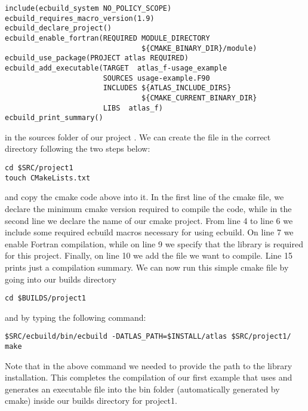 \begin{description}
\begin{lstlisting}[style=XMLStyle]
include(ecbuild_system NO_POLICY_SCOPE)
ecbuild_requires_macro_version(1.9)
ecbuild_declare_project()
ecbuild_enable_fortran(REQUIRED MODULE_DIRECTORY 
                                ${CMAKE_BINARY_DIR}/module)
ecbuild_use_package(PROJECT atlas REQUIRED)
ecbuild_add_executable(TARGET  atlas_f-usage_example
                       SOURCES usage-example.F90 
                       INCLUDES ${ATLAS_INCLUDE_DIRS}
                                ${CMAKE_CURRENT_BINARY_DIR}
                       LIBS  atlas_f)
ecbuild_print_summary()
\end{lstlisting}
%
in the sources folder of our project .
We can create the  file in the correct 
directory following the two steps below:
%
\begin{lstlisting}[style=BashStyle]
cd $SRC/project1
touch CMakeLists.txt
\end{lstlisting}
%
and copy the cmake code above into it.
In the first line of the cmake file, we declare the minimum cmake 
version required to compile the code, while in the second line 
we declare the name of our cmake project. 
From line 4 to line 6 we include some required ecbuild macros 
necessary for using ecbuild. On line 7 we enable Fortran compilation, 
while on line 9 we specify that the \Atlas library is required for 
this project. Finally, on line 10 we add the file we want to compile. 
Line 15 prints just a compilation summary. We can now run this simple 
cmake file by going into our builds directory 
%
\begin{lstlisting}[style=BashStyle]
cd $BUILDS/project1
\end{lstlisting}
%  
and by typing the following command:
%
\begin{lstlisting}[style=BashStyle]
$SRC/ecbuild/bin/ecbuild -DATLAS_PATH=$INSTALL/atlas $SRC/project1/
make 
\end{lstlisting}
%  
Note that in the above command we needed to provide the path 
to the \Atlas library installation. This completes the compilation 
of our first example that uses \Atlas and generates an executable 
file into the bin folder (automatically generated by cmake) inside
our builds directory for project1.
\end{description}
%

